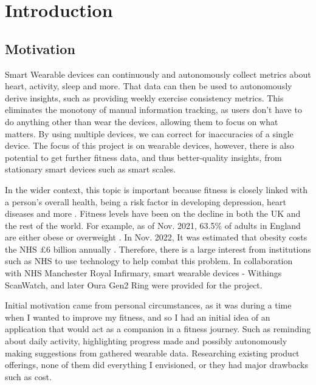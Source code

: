 \chapter{Introduction}
\label{cha:intro}

\section{Motivation}

Smart Wearable devices can continuously and autonomously collect metrics about heart, activity, 
sleep and more. That data can then be used to autonomously derive insights, such as providing weekly exercise consistency metrics. 
This eliminates the monotony of manual information tracking, as users don't have to do anything other than wear the devices,
 allowing them to focus on what matters. By using multiple devices, we can correct for inaccuracies of a single device. 
 The focus of this project is on wearable devices, however, there is also potential to get further fitness data, and thus better-quality insights, from stationary smart devices such as smart scales.

In the wider context, this topic is important because fitness is closely linked with a person's overall health, being a risk factor in developing depression, heart diseases and more \cite{nhsObesity}. 
Fitness levels have been on the decline in both the UK and the rest of the world.
For example, as of Nov. 2021, 63.5\% of adults in England are either obese or overweight \cite{ukObesity2023Survey}. 
In Nov. 2022, It was estimated that obesity costs the NHS £6 billion annually \cite{nhsObesityCost}.
Therefore, there is a large interest from institutions such as NHS to use technology to help combat this problem. In collaboration with NHS Manchester Royal Infirmary, smart wearable devices - Withings ScanWatch,
and later Oura Gen2 Ring were provided for the project.


Initial motivation came from personal circumstances, as it was during a time when I wanted to improve my fitness, and so I had an initial idea of an
application that would act as a companion in a fitness journey. Such as reminding about daily activity, highlighting progress made and
possibly autonomously making suggestions from gathered wearable data. Researching existing product offerings, none of them 
did everything I envisioned, or they had major drawbacks such as cost.

